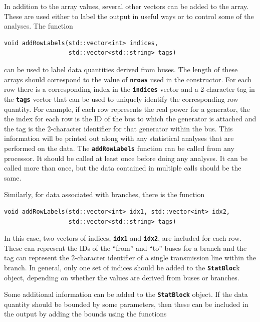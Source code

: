 \documentclass[12pt]{report} %
\begin{document}
In addition to the array values, several other vectors can be added to the array. These are used either to label the output in useful ways or to control some of the analyses. The function

{
\color{red}
\begin{Verbatim}[fontseries=b]
void addRowLabels(std::vector<int> indices,
                  std::vector<std::string> tags)
\end{Verbatim}
}

can be used to label data quantities derived from buses. The length of these arrays should correspond to the value of \texttt{\textbf{nrows}} used in the constructor. For each row there is a corresponding index in the \texttt{\textbf{indices}} vector and a 2-character tag in the \texttt{\textbf{tags}} vector that can be used to uniquely identify the corresponding row quantity. For example, if each row represents the real power for a generator, the the index for each row is the ID of the bus to which the generator is attached and the tag is the 2-character identifier for that generator within the bus. This information will be printed out along with any statistical analyses that are performed on the data. The \texttt{\textbf{addRowLabels}} function can be called from any processor. It should be called at least once before doing any analyses. It can be called more than once, but the data contained in multiple calls should be the same.

Similarly, for data associated with branches, there is the function

{
\color{red}
\begin{Verbatim}[fontseries=b]
void addRowLabels(std::vector<int> idx1, std::vector<int> idx2,
                  std::vector<std::string> tags)
\end{Verbatim}
}

In this case, two vectors of indices, \texttt{\textbf{idx1}} and \texttt{\textbf{idx2}}, are included for each row. These can represent the IDs of the ``from'' and ``to'' buses for a branch and the tag can represent the 2-character identifier of a single transmission line within the branch. In general, only one set of indices should be added to the \texttt{\textbf{StatBloc}}k object, depending on whether the values are derived from buses or branches.

Some additional information can be added to the \texttt{\textbf{StatBlock}} object. If the data quantity should be bounded by some parameters, then these can be included in the output by adding the bounds using the functions
\end{document}
